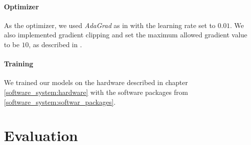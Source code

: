 \paragraph{Optimizer} As the optimizer, we used \emph{AdaGrad} \cite{Duchi:2011} as in \cite{Vinyals:2015} with the learning rate set to $0.01$. We also implemented gradient clipping and set the maximum allowed gradient value to be $10$, as described in \cite{Pascanu:2013}.

\paragraph{Training} We trained our models on the hardware described in chapter \ref{software_system:hardware} with the software packages from \ref{software_system:softwar_packages}.

\section{Evaluation}
\blindtext
